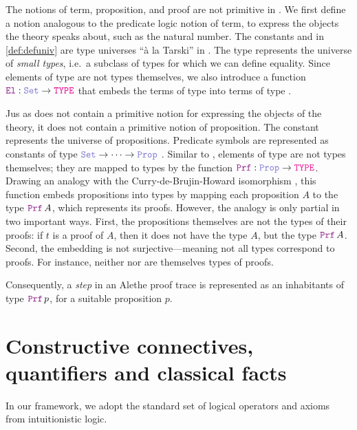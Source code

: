 The notions of term, proposition, and proof are not primitive in \lpm.
We ﬁrst deﬁne a notion analogous to the predicate logic notion of term, to express the objects the theory speaks about, such as the natural number.
The constants \set{} and \prop{} in \cref{def:defuniv} are type universes ``à la Tarski'' \cite[\S Universes]{intuitype} in \lpm.
The type \set{} represents the universe of \textit{small types}, i.e.\ a subclass of types for which we can define equality.
Since elements of type \set{} are not types themselves,
we also introduce a function $\el: \set \rightarrow \type$ that embeds the terms of type \set{} into terms of type \type.

Jus as \lpm{} does not contain a primitive notion for expressing the objects of the theory, it does not contain a primitive notion of proposition.
The constant \prop{} represents the universe of propositions. Predicate symbols are represented as constants of type $\set{} \ra \dots \ra \prop$ .
Similar to \set{}, elements of type \prop{} are not types themselves; they are mapped to types by the function $\prf{}: \prop \rightarrow \type$.
Drawing an analogy with the Curry-de-Brujin-Howard isomorphism \cite{curryhoward}, this function embeds propositions into types by mapping each proposition $A$ to the type $\prf\,A$, which represents its proofs.
However, the analogy is only partial in two important ways. First, the propositions themselves are not the types of their proofs: if $t$ is a proof of $A$, then it does not have the type $A$,
but the type $\prf\,A$. Second, the embedding is not surjective—meaning not all types correspond to proofs. For instance, neither \set{} nor \prop{} are themselves types of proofs.

Consequently, a \emph{step} in an Alethe proof trace is represented as an inhabitants of type $\prf{}\,p$, for a suitable proposition $p$.

\section{Constructive connectives, quantifiers and classical facts}
\label{ssec:encoding-prop}

In our framework, we adopt the standard set of logical operators and axioms from intuitionistic logic.

